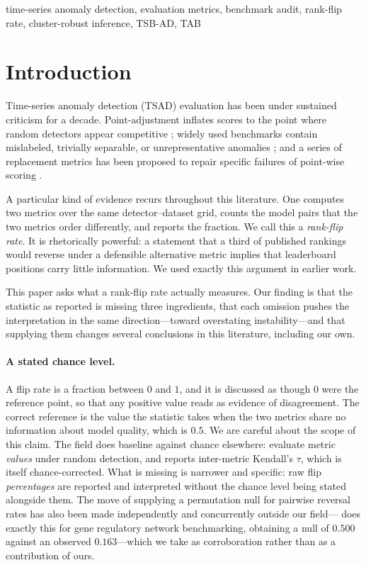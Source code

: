\documentclass[twoside,11pt]{article}
\begin{document}
\begin{keywords}
time-series anomaly detection, evaluation metrics, benchmark audit, rank-flip rate, cluster-robust inference, TSB-AD, TAB
\end{keywords}

\section{Introduction}

Time-series anomaly detection (TSAD) evaluation has been under sustained
criticism for a decade. Point-adjustment inflates scores to the point where
random detectors appear competitive \citep{kim2022towards}; widely used
benchmarks contain mislabeled, trivially separable, or unrepresentative anomalies
\citep{wu2023current, liu2024elephant}; and a series of replacement metrics has
been proposed to repair specific failures of point-wise scoring
\citep{tatbul2018precision, huet2022local, paparrizos2022vus, ghorbani2024pate}.

A particular kind of evidence recurs throughout this literature. One computes
two metrics over the same detector--dataset grid, counts the model pairs that
the two metrics order differently, and reports the fraction. We call this a
\emph{rank-flip rate}. It is rhetorically powerful: a statement that a third of
published rankings would reverse under a defensible alternative metric implies
that leaderboard positions carry little information. We used exactly this
argument in earlier work.

This paper asks what a rank-flip rate actually measures. Our finding is that
the statistic as reported is missing three ingredients, that each omission
pushes the interpretation in the same direction---toward overstating
instability---and that supplying them changes several conclusions in this
literature, including our own.

\paragraph{A stated chance level.} A flip rate is a fraction between $0$ and
$1$, and it is discussed as though $0$ were the reference point, so that any
positive value reads as evidence of disagreement. The correct reference is the
value the statistic takes when the two metrics share no information about model
quality, which is $0.5$. We are careful about the scope of this claim. The field
does baseline against chance elsewhere: \citet{yang2025problem} evaluate metric
\emph{values} under random detection, and \citet{lyu2026didwe} reports
inter-metric Kendall's $\tau$, which is itself chance-corrected. What is missing
is narrower and specific: raw flip \emph{percentages} are reported and
interpreted without the chance level being stated alongside them. The move of
supplying a permutation null for pairwise reversal rates has also been made
independently and concurrently outside our field---\citet{kendiukhov2026quantifying}
does exactly this for gene regulatory network benchmarking, obtaining a null of
$0.500$ against an observed $0.163$---which we take as corroboration rather than
as a contribution of ours.
\end{document}
